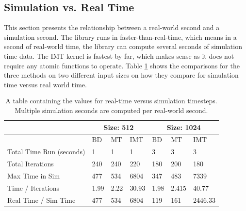 \subsection*{Simulation vs. Real Time}
This section presents the relationship between a real-world second and a simulation second. The library runs in faster-than-real-time, which means in a second of real-world time, the library can compute several seconds of simulation time data. The IMT kernel is fastest by far, which makes sense as it does not require any atomic functions to operate. Table \ref{table:time_comp} shows the comparisons for the three methods on two different input sizes on how they compare for simulation time versus real world time. 
\begin{table}[H]
\centering
\caption{A table containing the values for real-time versus simulation timesteps. Multiple simulation seconds are computed per real-world second.}
\label{table:time_comp}
\begin{tabular}{l|l|l|l|l|l|l|}
\cline{2-7}
                                                          & \multicolumn{3}{c|}{\cellcolor[HTML]{C0C0C0}\textbf{Size: 512}} & \multicolumn{3}{c|}{\cellcolor[HTML]{C0C0C0}\textbf{Size: 1024}} \\ \hline
\rowcolor[HTML]{EFEFEF} 
\multicolumn{1}{|l|}{\cellcolor[HTML]{EFEFEF}Kernel Used} & BD                  & MT                  & IMT                 & BD                 & MT                  & IMT                   \\ \hline
\multicolumn{1}{|l|}{Total Time Run (seconds)}            & 1                   & 1                   & 1                   & 3                  & 3                   & 3                     \\ \hline
\multicolumn{1}{|l|}{Total Iterations}                    & 240                 & 240                 & 220                 & 180                & 200                 & 180                   \\ \hline
\multicolumn{1}{|l|}{Max Time in Sim}                     & 477                 & 534                 & 6804                & 347                & 483                 & 7339                  \\ \hline
\multicolumn{1}{|l|}{Time / Iterations}                   & 1.99                & 2.22                & 30.93               & 1.98               & 2.415               & 40.77                 \\ \hline
\multicolumn{1}{|l|}{Real Time / Sim Time}                & 477                 & 534                 & 6804                & 119                & 161                 & 2446.33               \\ \hline
\end{tabular}
\end{table}

